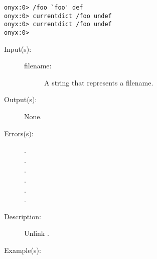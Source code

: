 \begin{description}
\begin{description}
\begin{verbatim}
onyx:0> /foo `foo' def
onyx:0> currentdict /foo undef
onyx:0> currentdict /foo undef
onyx:0>
		\end{verbatim}
	\end{description}
\label{systemdict:unlink}
\item[{\onyxop{filename}{unlink}{--}}: ]
	\begin{description}\item[]
	\item[Input(s): ]
		\begin{description}\item[]
		\item[filename: ]
			A string that represents a filename.
		\end{description}
	\item[Output(s): ] None.
	\item[Errors(s): ]
		\begin{description}\item[]
		\item[.]
		\item[.]
		\item[.]
		\item[.]
		\item[.]
		\item[.]
		\end{description}
	\item[Description: ]
		Unlink .
	\item[Example(s): ]\begin{verbatim}


\end{verbatim}
\end{description}
\end{description}
